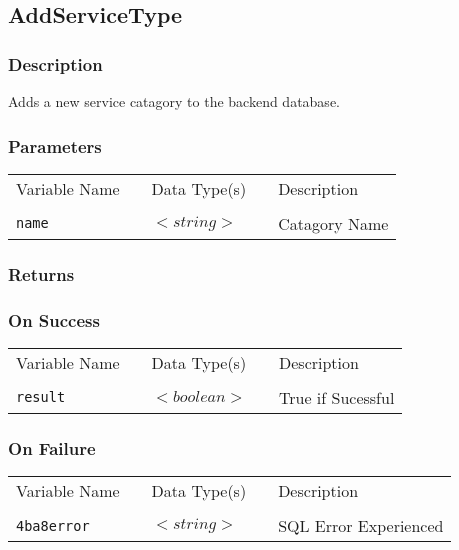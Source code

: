
\subsection{AddServiceType}

\subsubsection{Description}

Adds a new service catagory to the backend database.

\subsubsection{Parameters}

\begin{tabular}{lllll}
Variable Name	&		&	Data Type(s)		&	&	Description	\\
				&	&	&	&	\\
\verb!name! & \hspace{15mm} & $<string>$ & \hspace{15mm} & Catagory Name \\
\end{tabular}

\subsubsection{Returns}

\subsubsection{On Success}

\begin{tabular}{lllll}
Variable Name	&		&	Data Type(s)		&	&	Description	\\
				&	&	&	&	\\
\verb!result! & \hspace{15mm} & $<boolean>$ & \hspace{15mm} & True if Sucessful \\
\end{tabular}

\subsubsection{On Failure}

\begin{tabular}{lllll}
Variable Name	&		&	Data Type(s)		&	&	Description	\\
				&	&	&	&	\\
\verb!4ba8error! & \hspace{15mm} & $<string>$ & \hspace{15mm} & SQL Error Experienced \\
\end{tabular}

